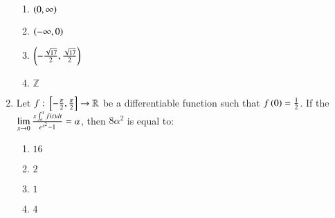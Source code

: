 \documentclass[journal]{IEEEtran}
\begin{document}
\begin{enumerate}
\begin{enumerate}
			\item $\left(0, \infty\right)$
			\item $\left(-\infty, 0\right)$
			\item $\left(-\frac{\sqrt{17}}{2}, \frac{\sqrt{17}}{2}\right)$
			\item $\mathbb{Z}$
		\end{enumerate}
	\item Let $f:{}\left[-\frac{\pi}{2}, \frac{\pi}{2}\right] \to \mathbb{R}$ be a differentiable function such that $f\left(0\right)=\frac{1}{2}$. If the $\lim\limits_{x\to0} \frac{x\int_o^xf\left(t\right)dt}{e^{x^2}-1}=\alpha$, then $8\alpha^2$ is equal to:
		\begin{enumerate}
			\item $16$
			\item $2$
			\item $1$
			\item $4$
		\end{enumerate}
\end{enumerate}
\end{document}
